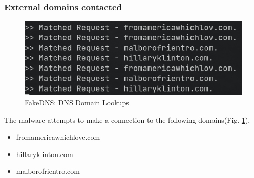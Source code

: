 \documentclass[10pt,a4paper]{article}
\begin{document}
			\subsubsection{External domains contacted}
				\begin{figure}[!htbp]%
					\centering
					\includegraphics[width=\columnwidth]{pics/fakedns.png}
					\caption{FakeDNS: DNS Domain Lookups}
					\label{fakedns}
				\end{figure}
				The malware attempts to make a connection to the following domains(Fig. \ref{fakedns}),
				\begin{itemize}
					\item fromamericawhichlove.com
					\item hillaryklinton.com
					\item malborofrientro.com
				\end{itemize}
\end{document}
